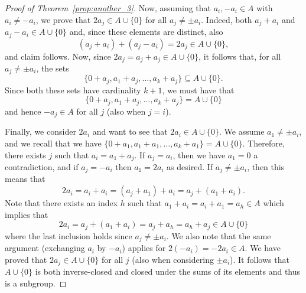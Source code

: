 \documentclass[11pt]{amsart}
\theoremstyle{definition}
\begin{document}
\begin{proof}[Proof of Theorem~\ref{prop:another_3}]
Now, assuming that $a_i,-a_i\in A$ with $a_i\neq -a_i$, we prove that $2a_j\in A\cup \{0\}$ for all $a_j\not=\pm a_i$. Indeed, both $a_j+a_i$ and $a_j-a_i\in A\cup \{0\}$ and, since these elements are distinct, also
$$(a_j+a_i)+(a_j-a_i)=2a_j\in A\cup \{0\},$$
and claim follows.
Now, since $2a_j=a_j+a_j\in A\cup \{0\}$, it follows that, for all $a_j\not=\pm a_i$, the sets 
$$\{0+a_j,a_1+a_j,\dots,a_k+a_j\}\subseteq A\cup \{0\}.$$
Since both these sets have cardinality $k+1$, we must have that 
$$\{0+a_j,a_1+a_j,\dots,a_k+a_j\}= A\cup \{0\}$$
and hence $-a_j\in A$ for all $j$ (also when $j=i$).

Finally, we consider $2a_i$ and want to see that $2a_i\in A\cup \{0\}$. We assume $a_1\not=\pm a_i$, and we recall that we have 
$\{0+a_1,a_1+a_1,\dots,a_k+a_1\}= A\cup \{0\}$.
Therefore, there exists $j$ such that $a_i=a_1+a_j$. 
If $a_j= a_i$, then we have $a_1=0$ a contradiction, and if $a_j= -a_i$ then $a_1=2a_i$ as desired. If $a_j\not=\pm a_i$, then 
this means that
$$2a_i=a_i+a_i=(a_j+a_1)+a_i=a_j+(a_1+a_i).$$
Note that there exists an index $h$ such that $a_1+a_i=a_i+a_1=a_h\in A$ which implies that 
$$2a_i=a_j+(a_1+a_i)=a_j+a_h=a_h+a_j \in A\cup \{0\}$$
where the last inclusion holds since $a_j\not=\pm a_i$. We also note that the same argument (exchanging $a_i$ by $-a_i$) applies for $2(-a_i)=-2a_i\in A$.
We have proved that
$2a_j\in A\cup\{0\}$ for all $j$ (also when considering $\pm a_i$). It follows that $A\cup \{0\}$ is both inverse-closed and closed under the sums of its elements and thus is a subgroup.
 \end{proof}
\end{document}
